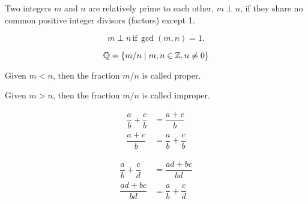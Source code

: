 \documentclass[20150903-160354-rs2.2-MarksMathNotebook.tex]{subfiles}
\begin{document}
\begin{definition}

Two integers $m$ and $n$ are relatively prime to each other, $m \perp n$, if they share no common positive integer divisors (factors) except 1.

\[
m \perp n \, \text{if} \, \gcd(m, n)=1.
\]

\end{definition}

\begin{definition}

\[
\mathbb{Q}=\set{m/n \suchthat m,n \in \mathbb{Z}, n \ne 0}
\]
\end{definition}

\begin{definition}

Given $m<n$, then the fraction $m/n$ is called \alert{proper}.

\end{definition}

\begin{definition}

Given $m>n$, then the fraction $m/n$ is called \alert{improper}.

\end{definition}

\begin{definition}
\begin{subequations}
\begin{align}
\dfrac{a}{b} + \dfrac{c}{b} &= \dfrac{a+c}{b} \label{eq:cd1} \\
\dfrac{a+c}{b}&= \dfrac{a}{b} + \dfrac{c}{b} \label{eq:cd2}
\end{align}
\end{subequations}
\end{definition}

\begin{arule}
\begin{subequations}
\begin{align}
\dfrac{a}{b} + \dfrac{c}{d} &= \dfrac{ad+bc}{bd} \label{eq:fooa1} \\
\dfrac{ad+bc}{bd} &= \dfrac{a}{b} + \dfrac{c}{d} \label{eq:fooa2}
\end{align}
\end{subequations}
\end{arule}
\end{document}
